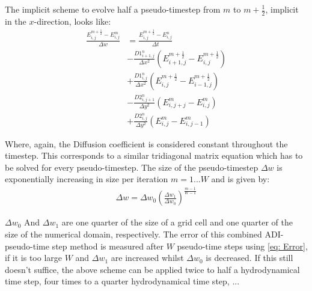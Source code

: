The implicit scheme to evolve half a pseudo-timestep from $m$ to $m + \frac{1}{2}$, implicit in the $x$-direction, looks like:
\begin{align}
\frac{E_{i,j}^{m+\frac{1}{2}} - E_{i,j}^{m}}{\Delta w} 
 &= \frac{E_{i,j}^{m+\frac{1}{2}} - E_{i,j}^{n}}{\Delta t} \\
 &- \frac{D1_{i+1,j}^{n}}{\Delta x^2} (E_{i+1,j}^{m+\frac{1}{2}} - E_{i,j}^{m+\frac{1}{2}}) \\
 &+ \frac{D1_{i,j}^{n}}{\Delta x^2} (E_{i,j}^{m+\frac{1}{2}} - E_{i-1,j}^{m+\frac{1}{2}}) \\
 &- \frac{D2_{i,j+1}^{n}}{\Delta y^2} (E_{i,j+j}^{m} - E_{i,j}^{m}) \\
 &+ \frac{D2_{i,j}^{n}}{\Delta y^2} (E_{i,j}^{m} - E_{i,j-1}^{m})
\end{align}

Where, again, the Diffusion coefficient is considered constant throughout the timestep. This corresponds to a similar tridiagonal matrix equation which has to be solved for every pseudo-timestep. The size of the pseudo-timestep $\Delta w$ is exponentially increasing in size per iteration $m = 1 ... W$ and is given by:
\begin{align}
\Delta w = \Delta w_0 \left(\frac{\Delta w_1}{\Delta w_0} \right)^\frac{m-1}{W-1}
\end{align}

$\Delta w_0$ And $\Delta w_1$ are one quarter of the size of a grid cell and one quarter of the size of the numerical domain, respectively. The error of this combined ADI-pseudo-time step method is measured after $W$ pseudo-time steps using \eqref{eq: Error}, if it is too large $W$ and $\Delta w_1$ are increased whilst $\Delta w_0$ is decreased. If this still doesn't suffice, the above scheme can be applied twice to half a hydrodynamical time step, four times to a quarter hydrodynamical time step, ... 

